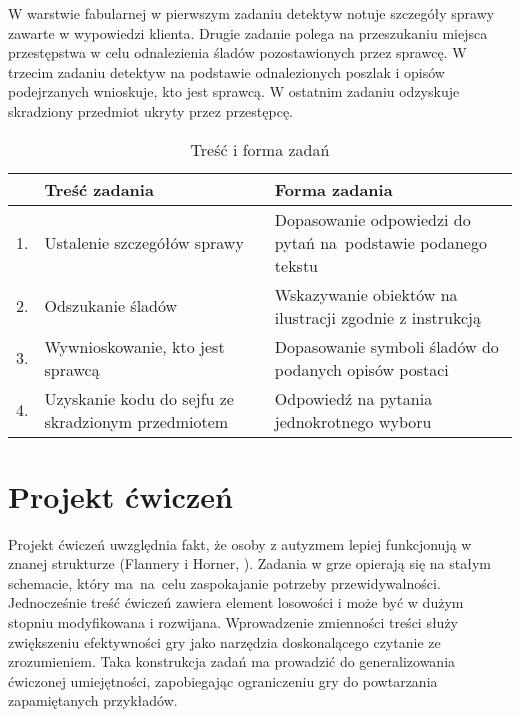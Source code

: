     W warstwie fabularnej w pierwszym zadaniu detektyw notuje szczegóły sprawy zawarte w wypowiedzi klienta.
    Drugie zadanie polega na przeszukaniu miejsca przestępstwa w celu odnalezienia śladów pozostawionych przez sprawcę.
    W trzecim zadaniu detektyw na podstawie odnalezionych poszlak i opisów podejrzanych wnioskuje, kto jest sprawcą.
    W ostatnim zadaniu odzyskuje skradziony przedmiot ukryty przez przestępcę.
    
    \begin{table}[H]
        \caption{Treść i forma zadań}
        \label{table:zadania}
        \begin{tabularx}{\textwidth}{ l X X }
         \hline
         
         \hline
          & \textbf{Treść zadania} & \textbf{Forma zadania} \\
          \hline
         1. & Ustalenie szczegółów sprawy & Dopasowanie odpowiedzi do pytań na~podstawie podanego tekstu \\
         2. & Odszukanie śladów & Wskazywanie obiektów na ilustracji zgodnie z instrukcją \\
         3. & Wywnioskowanie, kto jest sprawcą & Dopasowanie symboli śladów do podanych opisów postaci \\
         4. & Uzyskanie kodu do sejfu ze skradzionym przedmiotem & Odpowiedź na pytania jednokrotnego wyboru \\
         \hline
         
         \hline
        \end{tabularx}
    \end{table}

\section{Projekt ćwiczeń}

    Projekt ćwiczeń uwzględnia fakt, że osoby z autyzmem lepiej funkcjonują w znanej strukturze (Flannery i Horner, \cite*{flannery1994relationship}).
    Zadania w grze opierają się na stałym schemacie, który ma~na~celu zaspokajanie potrzeby przewidywalności.
    Jednocześnie treść ćwiczeń zawiera element losowości i może być w dużym stopniu modyfikowana i rozwijana.
    Wprowadzenie zmienności treści służy zwiększeniu efektywności gry jako narzędzia doskonalącego czytanie ze zrozumieniem.
    Taka konstrukcja zadań ma prowadzić do generalizowania ćwiczonej umiejętności, zapobiegając ograniczeniu gry do powtarzania zapamiętanych przykładów.
    
